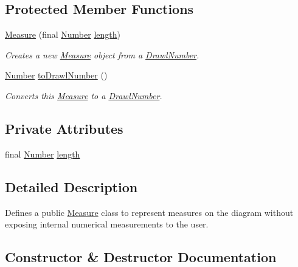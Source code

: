 \subsection*{Protected Member Functions}
\begin{DoxyCompactItemize}
\item 
\hyperlink{classcom_1_1aarrelaakso_1_1drawl_1_1_measure_a8a609ce1111f169f66c3c787d640363d}{Measure} (final \hyperlink{interfacecom_1_1aarrelaakso_1_1drawl_1_1_number}{Number} \hyperlink{classcom_1_1aarrelaakso_1_1drawl_1_1_measure_aef040b9b0dd7d4a925448d0854c2444a}{length})
\begin{DoxyCompactList}\small\item\em Creates a new \hyperlink{classcom_1_1aarrelaakso_1_1drawl_1_1_measure}{Measure} object from a \hyperlink{classcom_1_1aarrelaakso_1_1drawl_1_1_drawl_number}{Drawl\+Number}. \end{DoxyCompactList}\item 
\hyperlink{interfacecom_1_1aarrelaakso_1_1drawl_1_1_number}{Number} \hyperlink{classcom_1_1aarrelaakso_1_1drawl_1_1_measure_a6f01cfe45e01d43e89a73eaa17e3649f}{to\+Drawl\+Number} ()
\begin{DoxyCompactList}\small\item\em Converts this \hyperlink{classcom_1_1aarrelaakso_1_1drawl_1_1_measure}{Measure} to a \hyperlink{classcom_1_1aarrelaakso_1_1drawl_1_1_drawl_number}{Drawl\+Number}. \end{DoxyCompactList}\end{DoxyCompactItemize}
\subsection*{Private Attributes}
\begin{DoxyCompactItemize}
\item 
final \hyperlink{interfacecom_1_1aarrelaakso_1_1drawl_1_1_number}{Number} \hyperlink{classcom_1_1aarrelaakso_1_1drawl_1_1_measure_aef040b9b0dd7d4a925448d0854c2444a}{length}
\end{DoxyCompactItemize}


\subsection{Detailed Description}
Defines a public \hyperlink{classcom_1_1aarrelaakso_1_1drawl_1_1_measure}{Measure} class to represent measures on the diagram without exposing internal numerical measurements to the user. 

\subsection{Constructor \& Destructor Documentation}
\mbox{\label{classcom_1_1aarrelaakso_1_1drawl_1_1_measure_a8a609ce1111f169f66c3c787d640363d}} 
